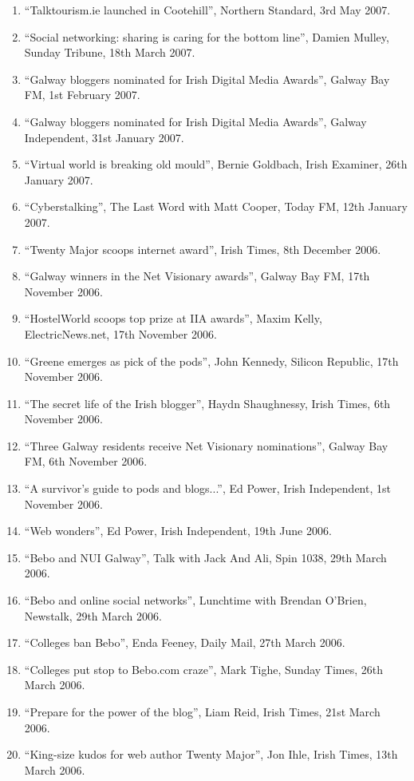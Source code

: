 \documentclass[10pt,a4paper]{res} %
\begin{document}
\begin{resume}
{\begin{enumerate}
\item ``Talktourism.ie launched in Cootehill'', Northern Standard, 3rd May 2007.
\item ``Social networking: sharing is caring for the bottom line'', Damien Mulley, Sunday Tribune, 18th March 2007.
\item ``Galway bloggers nominated for Irish Digital Media Awards'', Galway Bay FM, 1st February 2007.
\item ``Galway bloggers nominated for Irish Digital Media Awards'', Galway Independent, 31st January 2007.
\item ``Virtual world is breaking old mould'', Bernie Goldbach, Irish Examiner, 26th January 2007.
\item ``Cyberstalking'', The Last Word with Matt Cooper, Today FM, 12th January 2007.
\item ``Twenty Major scoops internet award'', Irish Times, 8th December 2006.
\item ``Galway winners in the Net Visionary awards'', Galway Bay FM, 17th November 2006.
\item ``HostelWorld scoops top prize at IIA awards'', Maxim Kelly, ElectricNews.net, 17th November 2006.
\item ``Greene emerges as pick of the pods'', John Kennedy, Silicon Republic, 17th November 2006.
\item ``The secret life of the Irish blogger'', Haydn Shaughnessy, Irish Times, 6th November 2006.
\item ``Three Galway residents receive Net Visionary nominations'', Galway Bay FM, 6th November 2006.
\item ``A survivor's guide to pods and blogs...'', Ed Power, Irish Independent, 1st November 2006.
\item ``Web wonders'', Ed Power, Irish Independent, 19th June 2006.
\item ``Bebo and NUI Galway'', Talk with Jack And Ali, Spin 1038, 29th March 2006.
\item ``Bebo and online social networks'', Lunchtime with Brendan O'Brien, Newstalk, 29th March 2006.
\item ``Colleges ban Bebo'', Enda Feeney, Daily Mail, 27th March 2006.
\item ``Colleges put stop to Bebo.com craze'', Mark Tighe, Sunday Times, 26th March 2006.
\item ``Prepare for the power of the blog'', Liam Reid, Irish Times, 21st March 2006.
\item ``King-size kudos for web author Twenty Major'', Jon Ihle, Irish Times, 13th March 2006.

\end{enumerate}}
\end{resume}
\end{document}
